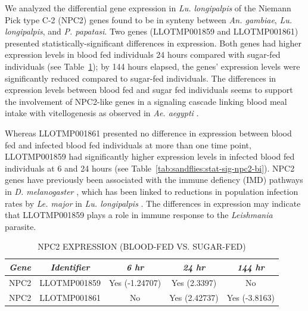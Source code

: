We analyzed the differential gene expression in \emph{Lu. longipalpis} of the Niemann Pick type C-2 (NPC2) genes found to be in synteny between \emph{An. gambiae}, \emph{Lu. longipalpis}, and \emph{P. papatasi}.  Two genes (LLOTMP001859 and LLOTMP001861) presented statistically-significant differences in expression. Both genes had higher expression levels in blood fed individuals 24 hours compared with sugar-fed individuals (see Table~\ref{tab:sandflies:stat-sig-npc2-sb}); by 144 hours elapsed, the genes' expression levels were significantly reduced compared to sugar-fed individuals.  The differences in expression levels between blood fed and sugar fed individuals seems to support the involvement of NPC2-like genes in a signaling cascade linking blood meal intake with vitellogenesis as observed in \emph{Ae. aegypti} \cite{Sirot2011}.

Whereas LLOTMP001861 presented no difference in expression between blood fed and infected blood fed individuals at more than one time point, LLOTMP001859 had significantly higher expression levels in infected blood fed individuals at 6 and 24 hours (see Table~\ref{tab:sandflies:stat-sig-npc2-bi}). NPC2 genes have previously been associated with the immune defiency (IMD) pathways in \emph{D. melanogaster} \cite{Shi2012}, which has been linked to reductions in population infection rates by \emph{Le. major} in \emph{Lu. longipalpis} \cite{Telleria2012}. The differences in expression may indicate that LLOTMP001859 plays a role in immune response to the \emph{Leishmania} parasite.

\begin{table}[H]
  \begin{center}
  \caption{\label{tab:sandflies:stat-sig-npc2-sb} NPC2 EXPRESSION (BLOOD-FED VS. SUGAR-FED)}
  \begin{tabular}{ c c c c c } \hline
    \emph{Gene} & \emph{Identifier} & \emph{6 hr} & \emph{24 hr} & \emph{144 hr} \\ \hline
    NPC2 & LLOTMP001859 & Yes (-1.24707) & Yes (2.3397) & No \\
    NPC2 & LLOTMP001861 & No & Yes (2.42737) & Yes (-3.8163)
  \end{tabular}
  \end{center}
\end{table}

